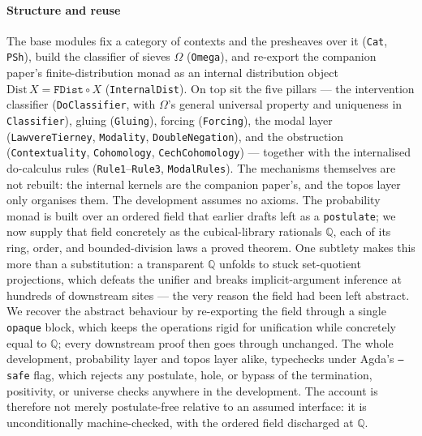 \documentclass{lmcs}
\newcommand{\Om}{\Omega}
\begin{document}
\paragraph{Structure and reuse}
The base modules fix a category of contexts and the presheaves over it (\texttt{Cat}, \texttt{PSh}), build the classifier of sieves $\Om$ (\texttt{Omega}), and re-export the companion paper's finite-distribution monad as an internal distribution object $\mathrm{Dist}\,X = \mathtt{FDist}\circ X$ (\texttt{InternalDist}).
On top sit the five pillars --- the intervention classifier (\texttt{DoClassifier}, with $\Om$'s general universal property and uniqueness in \texttt{Classifier}), gluing (\texttt{Gluing}), forcing (\texttt{Forcing}), the modal layer (\texttt{LawvereTierney}, \texttt{Modality}, \texttt{DoubleNegation}), and the obstruction (\texttt{Contextuality}, \texttt{Cohomology}, \texttt{CechCohomology}) --- together with the internalised do-calculus rules (\texttt{Rule1}--\texttt{Rule3}, \texttt{ModalRules}).
The mechanisms themselves are not rebuilt: the internal kernels are the companion paper's, and the topos layer only organises them.
The development assumes no axioms.
The probability monad is built over an ordered field that earlier drafts left as a \texttt{postulate}; we now supply that field concretely as the cubical-library rationals $\mathbb{Q}$, each of its ring, order, and bounded-division laws a proved theorem.
One subtlety makes this more than a substitution: a transparent $\mathbb{Q}$ unfolds to stuck set-quotient projections, which defeats the unifier and breaks implicit-argument inference at hundreds of downstream sites --- the very reason the field had been left abstract.
We recover the abstract behaviour by re-exporting the field through a single \texttt{opaque} block, which keeps the operations rigid for unification while concretely equal to $\mathbb{Q}$; every downstream proof then goes through unchanged.
The whole development, probability layer and topos layer alike, typechecks under Agda's \texttt{--safe} flag, which rejects any postulate, hole, or bypass of the termination, positivity, or universe checks anywhere in the development.
The account is therefore not merely postulate-free relative to an assumed interface: it is unconditionally machine-checked, with the ordered field discharged at $\mathbb{Q}$.
\end{document}
